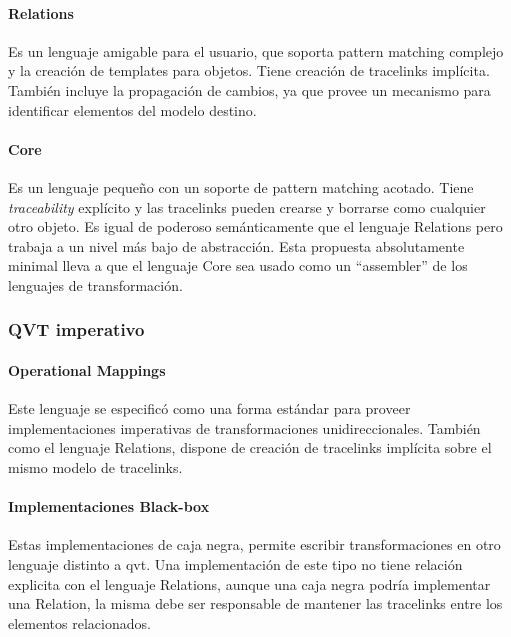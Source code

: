 \documentclass[a4paper,12pt,oneside,spanish]{book}
\begin{document}
\paragraph{Relations}

Es un lenguaje amigable para el usuario, que soporta pattern matching complejo y la creación de templates para objetos. Tiene creación de tracelinks implícita. También incluye la propagación de cambios, ya que provee un mecanismo para identificar elementos del modelo destino. 

\paragraph{Core}

Es un lenguaje pequeño con un soporte de pattern matching acotado. Tiene \textit{traceability} explícito y las tracelinks pueden crearse y borrarse como cualquier otro objeto. Es igual de poderoso semánticamente que el lenguaje Relations pero trabaja a un nivel más bajo de abstracción. Esta propuesta absolutamente minimal lleva a que el lenguaje Core sea usado como un “assembler” de los lenguajes de transformación.


\subsubsection{QVT imperativo}


\paragraph{Operational Mappings}

Este lenguaje se especificó como una forma estándar para proveer implementaciones imperativas de transformaciones unidireccionales. También como el lenguaje Relations, dispone de creación de tracelinks implícita sobre el mismo modelo de tracelinks.


\paragraph{Implementaciones Black-box}

Estas implementaciones de caja negra, permite escribir transformaciones en otro lenguaje distinto a \gls{qvt}. Una implementación de este tipo no tiene
relación explicita con el lenguaje Relations, aunque una caja negra podría implementar una Relation, la misma debe ser responsable de mantener las tracelinks entre los elementos relacionados.
\end{document}
